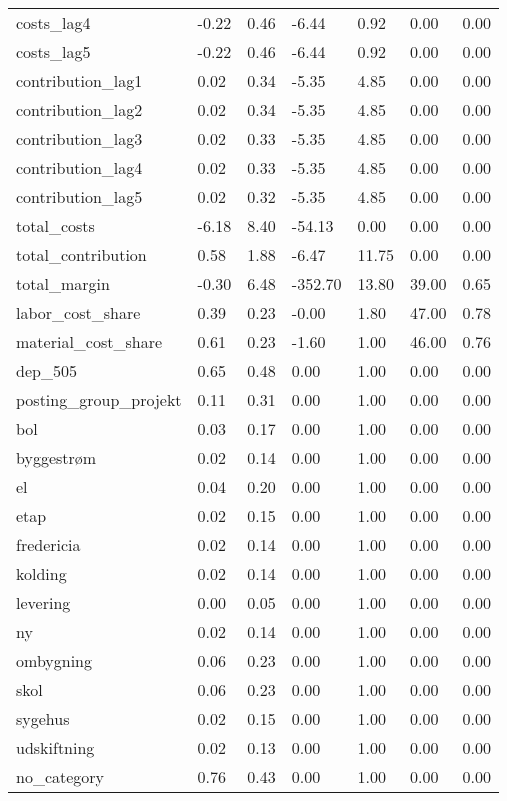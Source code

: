 \begin{landscape}
\begin{longtable}[h!]{lllllll}
costs_lag4 & -0.22 & 0.46 & -6.44 & 0.92 & 0.00 & 0.00 \\
costs_lag5 & -0.22 & 0.46 & -6.44 & 0.92 & 0.00 & 0.00 \\
contribution_lag1 & 0.02 & 0.34 & -5.35 & 4.85 & 0.00 & 0.00 \\
contribution_lag2 & 0.02 & 0.34 & -5.35 & 4.85 & 0.00 & 0.00 \\
contribution_lag3 & 0.02 & 0.33 & -5.35 & 4.85 & 0.00 & 0.00 \\
contribution_lag4 & 0.02 & 0.33 & -5.35 & 4.85 & 0.00 & 0.00 \\
contribution_lag5 & 0.02 & 0.32 & -5.35 & 4.85 & 0.00 & 0.00 \\
total_costs & -6.18 & 8.40 & -54.13 & 0.00 & 0.00 & 0.00 \\
total_contribution & 0.58 & 1.88 & -6.47 & 11.75 & 0.00 & 0.00 \\
total_margin & -0.30 & 6.48 & -352.70 & 13.80 & 39.00 & 0.65 \\
labor_cost_share & 0.39 & 0.23 & -0.00 & 1.80 & 47.00 & 0.78 \\
material_cost_share & 0.61 & 0.23 & -1.60 & 1.00 & 46.00 & 0.76 \\
dep_505 & 0.65 & 0.48 & 0.00 & 1.00 & 0.00 & 0.00 \\
posting_group_projekt & 0.11 & 0.31 & 0.00 & 1.00 & 0.00 & 0.00 \\
bol & 0.03 & 0.17 & 0.00 & 1.00 & 0.00 & 0.00 \\
byggestrøm & 0.02 & 0.14 & 0.00 & 1.00 & 0.00 & 0.00 \\
el & 0.04 & 0.20 & 0.00 & 1.00 & 0.00 & 0.00 \\
etap & 0.02 & 0.15 & 0.00 & 1.00 & 0.00 & 0.00 \\
fredericia & 0.02 & 0.14 & 0.00 & 1.00 & 0.00 & 0.00 \\
kolding & 0.02 & 0.14 & 0.00 & 1.00 & 0.00 & 0.00 \\
levering & 0.00 & 0.05 & 0.00 & 1.00 & 0.00 & 0.00 \\
ny & 0.02 & 0.14 & 0.00 & 1.00 & 0.00 & 0.00 \\
ombygning & 0.06 & 0.23 & 0.00 & 1.00 & 0.00 & 0.00 \\
skol & 0.06 & 0.23 & 0.00 & 1.00 & 0.00 & 0.00 \\
sygehus & 0.02 & 0.15 & 0.00 & 1.00 & 0.00 & 0.00 \\
udskiftning & 0.02 & 0.13 & 0.00 & 1.00 & 0.00 & 0.00 \\
no_category & 0.76 & 0.43 & 0.00 & 1.00 & 0.00 & 0.00 \\

\end{longtable}
\end{landscape}
